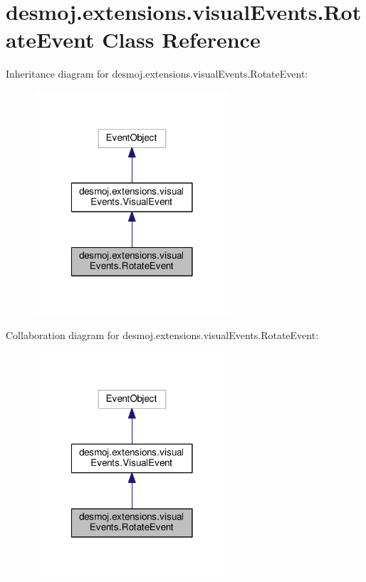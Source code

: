 \section{desmoj.\-extensions.\-visual\-Events.\-Rotate\-Event Class Reference}
\label{classdesmoj_1_1extensions_1_1visual_events_1_1_rotate_event}


Inheritance diagram for desmoj.\-extensions.\-visual\-Events.\-Rotate\-Event\-:
\nopagebreak
\begin{figure}[H]
\begin{center}
\leavevmode
\includegraphics[width=206pt]{classdesmoj_1_1extensions_1_1visual_events_1_1_rotate_event__inherit__graph}
\end{center}
\end{figure}


Collaboration diagram for desmoj.\-extensions.\-visual\-Events.\-Rotate\-Event\-:
\nopagebreak
\begin{figure}[H]
\begin{center}
\leavevmode
\includegraphics[width=206pt]{classdesmoj_1_1extensions_1_1visual_events_1_1_rotate_event__coll__graph}
\end{center}
\end{figure}
